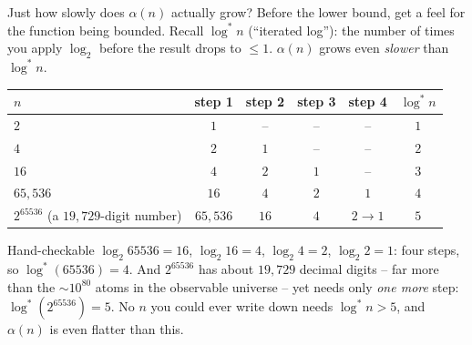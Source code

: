 \documentclass[11pt,aspectratio=169]{beamer}
\begin{document}
\begin{frame}{Just how slowly does $\alpha(n)$ actually grow?}
  \small
  Before the lower bound, get a feel for the function being bounded. Recall
  $\log^* n$ (``iterated log''): the number of times you apply $\log_2$ before the
  result drops to $\le 1$. $\alpha(n)$ grows even \emph{slower} than $\log^* n$.
  \begin{center}
  \begin{tabular}{@{}lccccc@{}}
    \toprule
    $n$ & step 1 & step 2 & step 3 & step 4 & $\log^* n$ \\
    \midrule
    $2$ & $1$ & -- & -- & -- & $1$ \\
    $4$ & $2$ & $1$ & -- & -- & $2$ \\
    $16$ & $4$ & $2$ & $1$ & -- & $3$ \\
    $65{,}536$ & $16$ & $4$ & $2$ & $1$ & $4$ \\
    $2^{65536}$ (a $19{,}729$-digit number) & $65{,}536$ & $16$ & $4$ & $2\to1$ & $5$ \\
    \bottomrule
  \end{tabular}
  \end{center}
  \begin{exampleblock}{Hand-checkable}
    $\log_2 65536 = 16$, $\log_2 16 = 4$, $\log_2 4 = 2$, $\log_2 2 = 1$: four steps, so
    $\log^*(65536)=4$. And $2^{65536}$ has about $19{,}729$ decimal digits -- far more
    than the $\sim 10^{80}$ atoms in the observable universe -- yet needs only \emph{one
    more} step: $\log^*(2^{65536}) = 5$. No $n$ you could ever write down needs
    $\log^* n > 5$, and $\alpha(n)$ is even flatter than this.
  \end{exampleblock}
\end{frame}
\end{document}
